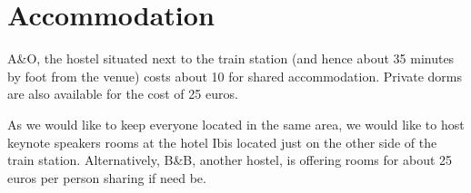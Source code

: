 

\section{Accommodation}

A\&O, the hostel situated next to the train station (and hence about 35 minutes by foot from the venue) costs about 10 for shared accommodation. Private dorms are also available for the cost of 25 euros. 

As we would like to keep everyone located in the same area, we would like to host keynote speakers rooms at the hotel Ibis located just on the other side of the train station. 
Alternatively, B\&B, another hostel, is offering rooms for about 25 euros per person sharing if need be. 


